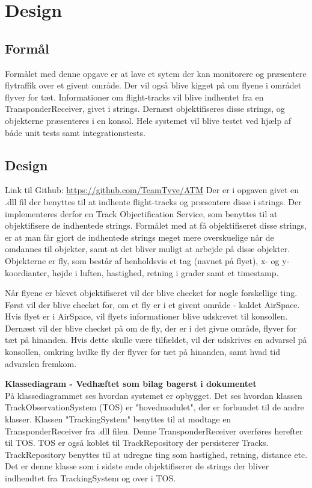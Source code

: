 \graphicspath{{Billeder/}}

\chapter{Design}
\section{Formål}
Formålet med denne opgave er at lave et sytem der kan monitorere og præsentere flytraffik over et givent område. Der vil også blive kigget på om flyene i området flyver for tæt. Informationer om flight-tracks vil blive indhentet fra en TransponderReceiver, givet i strings. Dernæst objektifiseres disse strings, og objekterne præsenteres i en konsol. 
Hele systemet vil blive testet ved hjælp af både unit tests samt integrationstests.


\section{Design}
Link til Github: \url{https://github.com/TeamTyve/ATM} \newline \newline 
Der er i opgaven givet en .dll fil der benyttes til at indhente flight-tracks og præsentere disse i strings. Der implementeres derfor en Track Objectification Service, som benyttes til at objektifisere de indhentede strings. \tabularnewline
Formålet med at få objektifiseret disse strings, er at man får gjort de indhentede strings meget mere overskuelige når de omdannes til objekter, samt at det bliver muligt at arbejde på disse objekter. \newline
Objekterne er fly, som består af henholdsvis et tag (navnet på flyet), x- og y-koordianter, højde i luften, hastighed, retning i grader samt et timestamp. \newline

Når flyene er blevet objektifiseret vil der blive checket for nogle forskellige ting. \tabularnewline
Først vil der blive checket for, om et fly er i et givent område - kaldet AirSpace. Hvis flyet er i AirSpace, vil flyets informationer blive udskrevet til konsollen.
Dernæst vil der blive checket på om de fly, der er i det givne område, flyver for tæt på hinanden. Hvis dette skulle være tilfældet, vil der udskrives en advarsel på konsollen, omkring hvilke fly der flyver for tæt på hinanden, samt hvad tid advarslen fremkom. \newline

\textbf{Klassediagram - Vedhæftet som bilag bagerst i dokumentet} \\
På klassediagrammet ses hvordan systemet er opbygget. \tabularnewline
Det ses hvordan klassen TrackObservationSystem (TOS) er "hovedmodulet", der er forbundet til de andre klasser.
Klassen "TrackingSystem" benyttes til at modtage en TransponderReceiver fra .dll filen. Denne TransponderReceiver overføres herefter til TOS.
TOS er også koblet til TrackRepository der persisterer Tracks. TrackRepository benyttes til at udregne ting som hastighed, retning, distance etc. Det er denne klasse som i sidste ende objektifiserer de strings der bliver indhendtet fra TrackingSystem og over i TOS.

